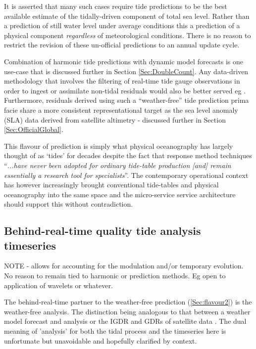 It is asserted that many such cases require tide predictions to be the best available estimate of the tidally-driven component of total sea level.   Rather than a prediction of still water level under average conditions this a prediction of a physical component \textit{regardless} of meteorological conditions.  
There is no reason to restrict the revision of these un-official predictions to an annual update cycle.

Combination of harmonic tide predictions with dynamic model forecasts is one use-case \citep{Taylor:2017coa} that is discussed further in Section \ref{Sec:DoubleCount}.
Any data-driven methodology that involves the filtering of real-time tide gauge observations in order to ingest or assimilate non-tidal residuals would also be better served  
eg \cite{10.3389/fmars.2019.00437}.
Furthermore, residuals derived using such a ``weather-free'' tide prediction prima facie share a more consistent representational target as the sea level anomaly (SLA) data derived from satellite altimetry - discussed further in Section \ref{Sec:OfficialGlobal}.


This flavour of prediction is simply what physical oceanography has largely thought of as `tides' for decades \cite{Munk:1966ts} despite the fact that response method techniques ``\textit{...have never been adopted for ordinary tide-table production [and] remain essentially a research tool for specialists}''\citep[p.198]{Cartwright:2000tt}.
The contemporary operational context has however increasingly brought conventional tide-tables and physical oceanography into the same space and the micro-service service architecture should support this without contradiction. 
      
\subsection{Behind-real-time quality tide analysis timeseries}  
\label{Sec:flavour3}
 
NOTE - allows for accounting for the modulation and/or temporary evolution.    No reason to remain tied to harmonic or prediction methods.    Eg open to application of wavelets or whatever.


 
The behind-real-time partner to the weather-free prediction (\ref{Sec:flavour2}) is the weather-free analysis.   The distinction being analogous to that between a weather model forecast and analysis or the IGDR and GDRs of satellite data \cite{Picot:2003tp}.   
The dual meaning of 'analysis' for both the tidal process and the timeseries here is unfortunate but unavoidable and hopefully clarified by context. 

